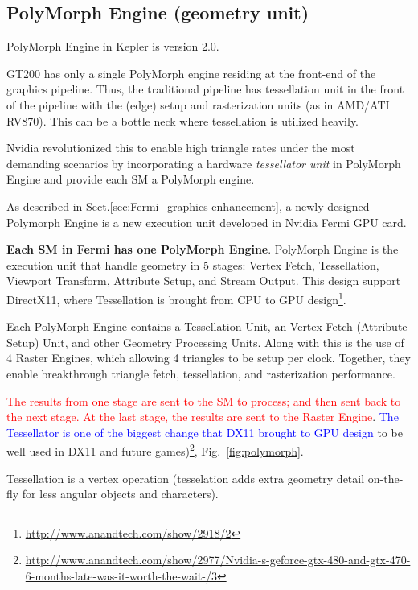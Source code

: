 \subsection{PolyMorph Engine (geometry unit)}
\label{sec:polymorph-unit-+}

PolyMorph Engine in Kepler is version 2.0. 

GT200 has only a single PolyMorph engine residing at the front-end of
the graphics pipeline. Thus, the traditional pipeline has tessellation
unit in the front of the pipeline with the (edge) setup and
rasterization units (as in AMD/ATI RV870). This can be a bottle neck
where tessellation is utilized heavily. 

Nvidia revolutionized this to enable high triangle rates under the most
demanding scenarios by incorporating a hardware {\it tessellator unit} in
PolyMorph Engine and provide each SM a PolyMorph engine.

As described in Sect.\ref{sec:Fermi_graphics-enhancement}, a newly-designed
Polymorph Engine is a new execution unit developed in Nvidia Fermi GPU card.

{\bf Each SM in Fermi has one PolyMorph Engine}. PolyMorph Engine is the execution
unit that handle geometry in 5 stages: Vertex Fetch, Tessellation, Viewport
Transform, Attribute Setup, and Stream Output. This design support DirectX11,
where Tessellation is brought from CPU to GPU
design\footnote{\url{http://www.anandtech.com/show/2918/2}}.

Each PolyMorph Engine contains a Tessellation Unit, an Vertex Fetch (Attribute
Setup) Unit, and other Geometry Processing Units. Along with this is the use of
4 Raster Engines, which allowing 4 triangles to be setup per clock. Together,
they enable breakthrough triangle fetch, tessellation, and rasterization
performance.

\textcolor{red}{The results from one stage are sent to the SM to
  process; and then sent back to the next stage. At the last stage,
  the results are sent to the Raster Engine}.
\textcolor{blue}{The Tessellator is one of the biggest change that
  DX11 brought to GPU design}
to be well used in DX11 and future
games)\footnote{\url{http://www.anandtech.com/show/2977/Nvidia-s-geforce-gtx-480-and-gtx-470-6-months-late-was-it-worth-the-wait-/3}},
Fig.~\ref{fig:polymorph}.


\begin{framed}
Tessellation is a vertex operation (tesselation adds extra geometry detail
on-the-fly for less angular objects and characters).
\end{framed}

